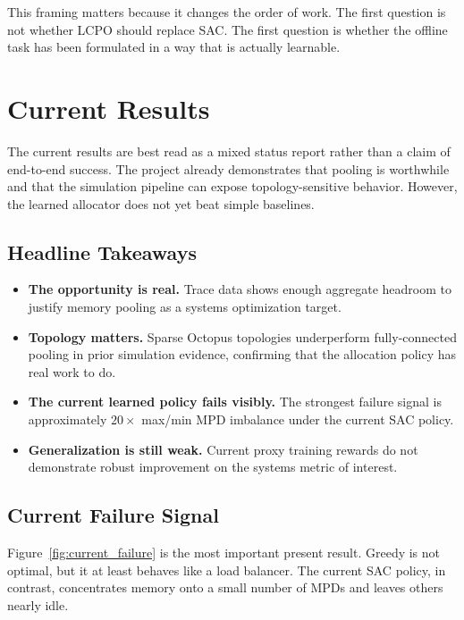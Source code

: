 \documentclass[11pt]{article}
\theoremstyle{definition}
\begin{document}
This framing matters because it changes the order of work. The first question is
not whether LCPO should replace SAC. The first question is whether the offline
task has been formulated in a way that is actually learnable.

\section{Current Results}

The current results are best read as a mixed status report rather than a claim of
end-to-end success. The project already demonstrates that pooling is worthwhile
and that the simulation pipeline can expose topology-sensitive behavior. However,
the learned allocator does not yet beat simple baselines.

\subsection{Headline Takeaways}

\begin{itemize}[nosep]
    \item \textbf{The opportunity is real.} Trace data shows enough aggregate
    headroom to justify memory pooling as a systems optimization target.
    \item \textbf{Topology matters.} Sparse Octopus topologies underperform
    fully-connected pooling in prior simulation evidence, confirming that the
    allocation policy has real work to do.
    \item \textbf{The current learned policy fails visibly.} The strongest failure
    signal is approximately $20\times$ max/min MPD imbalance under the current
    SAC policy.
    \item \textbf{Generalization is still weak.} Current proxy training rewards do
    not demonstrate robust improvement on the systems metric of interest.
\end{itemize}

\subsection{Current Failure Signal}

Figure~\ref{fig:current_failure} is the most important present result. Greedy is
not optimal, but it at least behaves like a load balancer. The current SAC
policy, in contrast, concentrates memory onto a small number of MPDs and leaves
others nearly idle.
\end{document}
